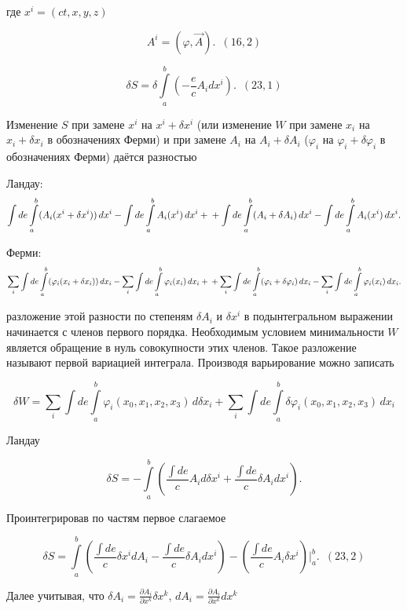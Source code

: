 \documentclass[11pt]{article}
\begin{document}
где \(x^i = \left(ct, x, y, z\right)\)

\[A^i=\left(\varphi, \vec A\right).\,\,\, (16,2)\]

    \[\delta S = \delta \int\limits_{a}^{b} \left(-\frac{e}{c}A_i d x^i\right).\,\,\,  (23,1)\]

    Изменение \(S\) при замене \(x^i\) на \(x^i + \delta x^i\) (или
изменение \(W\) при замене \(x_i\) на \(x_i + \delta x_i\) в
обозначениях Ферми) и при замене \(A_i\) на \(A_i + \delta A_i\)
(\(\varphi_i\) на \(\varphi_i + \delta \varphi_i\) в обозначениях Ферми)
даётся разностью

Ландау: \[
\int de \int\limits_{a}^{b} (A_i(x^i + \delta x^i)) \, dx^i - \int de \int\limits_{a}^{b} A_i(x^i) \, dx^i
+\\+
\int de \int\limits_{a}^{b} (A_i + \delta A_i) \, dx^i - \int de \int\limits_{a}^{b} A_i(x^i) \, dx^i
.
\]

Ферми: \[
\sum_i\int de \int\limits_{a}^{b} (\varphi_i(x_i + \delta x_i)) \, dx_i - \sum_i\int de \int\limits_{a}^{b} \varphi_i(x_i) \, dx_i
+\\+
\sum_i\int de \int\limits_{a}^{b} (\varphi_i + \delta \varphi_i) \, dx_i - \sum_i\int de \int\limits_{a}^{b} \varphi_i(x_i) \, dx_i
.
\]

разложение этой разности по степеням \(\delta A_i\) и \(\delta x^i\) в
подынтегральном выражении начинается с членов первого порядка.
Необходимым условием минимальности \(W\) является обращение в нуль
совокупности этих членов. Такое разложение называют первой вариацией
интеграла. Производя варьирование можно записать

\[\delta W =  \sum\limits_i \int de \int\limits_{a}^{b}  \varphi_i(x_0, x_1, x_2, x_3) \,d \delta x_i + \sum\limits_i \int de \int\limits_{a}^{b} \delta \varphi_i(x_0, x_1, x_2, x_3) \,d x_i\]

    Ландау

\[\delta S = - \int\limits_{a}^{b} \left(\frac{\int de}{c}A_i d \delta x^i + \frac{\int de}{c}\delta A_i d x^i\right).\]

    Проинтегрировав по частям первое слагаемое

\[\delta S = \int\limits_{a}^{b} \left(\frac{\int de}{c} \delta x^i d A_i - \frac{\int de}{c}\delta A_i d x^i\right) -  \left(\frac{\int de}{c}A_i \delta x^i \right) \Bigg|_{a}^{b}.\,\,\,  (23,2)\]

    Далее учитывая, что
\(\delta A_i = \frac{\partial A_i}{\partial x^k} \delta x^k\),
\(d A_i = \frac{\partial A_i}{\partial x^k} d x^k\)
\end{document}
